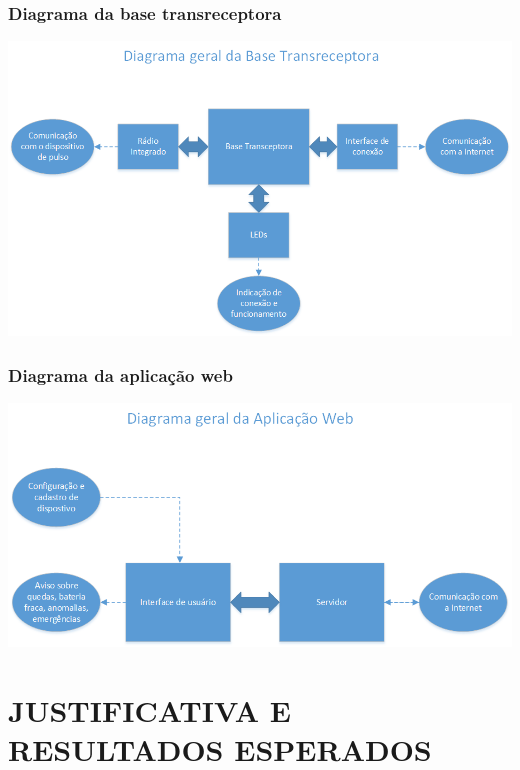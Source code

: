 \documentclass[a4paper]{article}
\begin{document}
\subsubsection{Diagrama da base transreceptora}
\begin{center}
\includegraphics[scale=0.75]{figuras/diagrama_base}
\end{center}

\subsubsection{Diagrama da aplicação web}
\begin{center}
\includegraphics[scale=0.75]{figuras/diagrama_web}
\end{center}

\section{JUSTIFICATIVA E RESULTADOS ESPERADOS}
\end{document}
